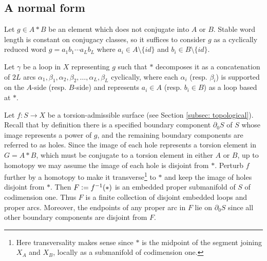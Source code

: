 \documentclass{amsart}
\theoremstyle{definition}
\numberwithin{equation}{section}
\theoremstyle{theorem}
\theoremstyle{remark}
\def\defeq{\vcentcolon=}
\begin{document}
	\subsection{A normal form}\label{subsec: normal form}
	Let $g\in A*B$ be an element which does not conjugate into $A$ or $B$. Stable word length is constant on conjugacy classes, so it suffices to consider $g$ as a cyclically reduced word $g=a_1b_1\cdots a_L b_L$ where $a_i\in A\setminus\{id\}$ and $b_i\in B\setminus\{id\}$.
	
	Let $\gamma$ be a loop in $X$ representing $g$ such that $*$ decomposes it as a concatenation of 
	$2L$ arcs $\alpha_1,\beta_1,\alpha_2,\beta_2,\ldots,\alpha_L,\beta_L$ cyclically, 
	where each $\alpha_i$ (resp. $\beta_i$) is supported on
	the $A$-side (resp. $B$-side) and represents $a_i\in A$ (resp. $b_i\in B$) as a loop based at $*$.
	
	Let $f:S\to X$ be a torsion-admissible surface (see Section \ref{subsec: topological}). 
	Recall that by definition there is a specified boundary component $\partial_0 S$ of $S$ whose image represents a power of $g$, and the remaining boundary components are referred to as holes. Since the image of each hole represents a torsion element in $G=A*B$, which must be conjugate to a torsion element in either $A$ or $B$, up to homotopy we may assume the image of each hole is disjoint from $*$.
	Perturb $f$ further by a homotopy to make it transverse\footnote{Here transversality makes sense since $*$ is the midpoint of the segment joining $X_A$ and $X_B$, locally as a submanifold of codimension one.} to $*$ and keep the image of holes disjoint from $*$. Then $F\defeq f^{-1}(*)$ is an embedded proper submanifold of $S$ of codimension one. Thus $F$ is a finite collection of disjoint embedded loops and proper arcs. 
	Moreover, the endpoints of any proper arc in $F$ lie on $\partial_0 S$ since all other boundary components are disjoint from $F$.
	
\end{document}
